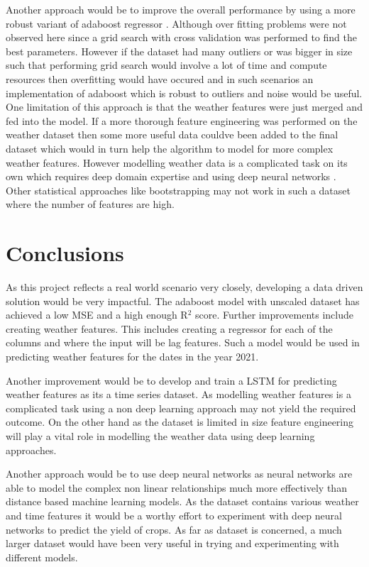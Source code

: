 \documentclass{article}
\begin{document}
Another approach would be to improve the overall performance by using a more robust variant of adaboost regressor \cite{kummer2014adaboost}. Although over fitting problems were not observed here since a grid search with cross validation was performed to find the best parameters.
However if the dataset had many outliers or was bigger in size such that performing grid search would involve a lot of time and compute resources then overfitting would have occured and in such scenarios an implementation of adaboost which is robust to outliers and noise would be useful.
One limitation of this approach is that the weather features were just merged and fed into the model. If a more thorough feature engineering was performed on the weather dataset then some more useful data couldve been added to the final dataset which would in turn help the algorithm to model for more complex weather features. However modelling weather data is a complicated task on its own which requires deep domain expertise and using deep neural networks \cite{maqsood2004ensemble}.
Other statistical approaches like bootstrapping may not work in such a dataset where the number of features are high. 


\section{Conclusions}
As this project reflects a real world scenario very closely, developing a data driven solution would be very impactful. The adaboost model with unscaled dataset has achieved a low MSE and a high enough R$^2$ score. Further improvements include creating weather features. This includes creating a regressor for each of the columns and where the input will be lag features. Such a model would be used in predicting weather features for the dates in the year 2021.  

Another improvement would be to develop and train a LSTM for predicting weather features as its a time series dataset\cite{siami2019performance}. As modelling weather features is a complicated task using a non deep learning approach may not yield the required outcome. On the other hand as the dataset is limited in size feature engineering will play a vital role in modelling the weather data using deep learning approaches.

Another approach would be to use deep neural networks as neural networks are able to model the complex non linear relationships much more effectively than distance based machine learning models. As the dataset contains various weather and time features it would be a worthy effort to experiment with deep neural networks to predict the yield of crops\cite{bhojani2020wheat}.
As far as dataset is concerned, a much larger dataset would have been very useful in trying and experimenting with different models.




\end{document}
